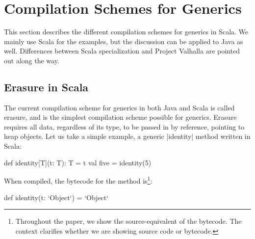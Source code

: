 \section{Compilation Schemes for Generics}
\label{sec:minibox}

This section describes the different compilation schemes for generics in Scala. We mainly use Scala for the examples, but the discussion can be applied to Java as well. Differences between Scala specialization and Project Valhalla are pointed out along the way. %

\subsection{Erasure in Scala}


The current compilation scheme for generics in both Java and Scala is called erasure, and is the simplest compilation scheme possible for generics. Erasure requires all data, regardless of its type, to be passed in by reference, pointing to heap objects. Let us take a simple example, a generic |identity| method written in Scala:

\begin{lstlisting-nobreak}
 def identity[T](t: T): T = t
 val five = identity(5)
\end{lstlisting-nobreak}

When compiled, the bytecode for the method is\footnote{Throughout the paper, we show the source-equivalent of the bytecode. The context clarifies whether we are showing source code or bytecode.}:

\begin{lstlisting-nobreak}
 def identity(t: `Object`) = `Object`
\end{lstlisting-nobreak}

